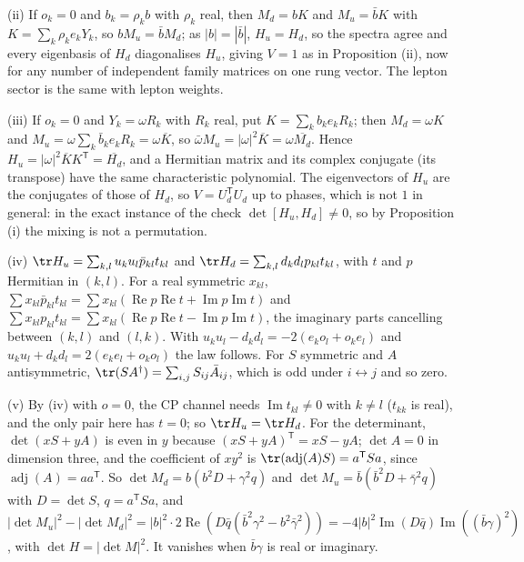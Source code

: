 (ii) If $o_{k} = 0$ and $b_{k} = \rho_{k}b$ with $\rho_{k}$ real, then $M_{d} = bK$ and $M_{u} = \bar{b}K$ with $K = \sum_{k}\rho_{k}e_{k}Y_{k}$, so $bM_{u} = \bar{b}M_{d}$; as $|b| = |\bar{b}|$, $H_{u} = H_{d}$, so the spectra agree and every eigenbasis of $H_{d}$ diagonalises $H_{u}$, giving $V = 1$ as in Proposition (ii), now for any number of independent family matrices on one rung vector. The lepton sector is the same with lepton weights.

(iii) If $o_{k} = 0$ and $Y_{k} = \omega R_{k}$ with $R_{k}$ real, put $K = \sum_{k}b_{k}e_{k}R_{k}$; then $M_{d} = \omega K$ and $M_{u} = \omega\sum_{k}\bar{b}_{k}e_{k}R_{k} = \omega\overline{K}$, so $\bar{\omega}M_{u} = |\omega|^{2}\overline{K} = \omega\overline{M_{d}}$. Hence $H_{u} = |\omega|^{2}\overline{K}K^{\mathsf T} = \overline{H_{d}}$, and a Hermitian matrix and its complex conjugate (its transpose) have the same characteristic polynomial. The eigenvectors of $H_{u}$ are the conjugates of those of $H_{d}$, so $V = U_{d}^{\mathsf T}U_{d}$ up to phases, which is not $1$ in general: in the exact instance of the check $\det[H_{u}, H_{d}] \ne 0$, so by Proposition (i) the mixing is not a permutation.

(iv) $\tr H_{u} = \sum_{k,l}u_{k}u_{l}\bar{p}_{kl}t_{kl}$ and $\tr H_{d} = \sum_{k,l}d_{k}d_{l}p_{kl}t_{kl}$, with $t$ and $p$ Hermitian in $(k, l)$. For a real symmetric $x_{kl}$, $\sum x_{kl}\bar{p}_{kl}t_{kl} = \sum x_{kl}(\operatorname{Re}p\operatorname{Re}t + \operatorname{Im}p\operatorname{Im}t)$ and $\sum x_{kl}p_{kl}t_{kl} = \sum x_{kl}(\operatorname{Re}p\operatorname{Re}t - \operatorname{Im}p\operatorname{Im}t)$, the imaginary parts cancelling between $(k, l)$ and $(l, k)$. With $u_{k}u_{l} - d_{k}d_{l} = -2(e_{k}o_{l} + o_{k}e_{l})$ and $u_{k}u_{l} + d_{k}d_{l} = 2(e_{k}e_{l} + o_{k}o_{l})$ the law follows. For $S$ symmetric and $A$ antisymmetric, $\tr(SA^{\dagger}) = \sum_{i,j}S_{ij}\bar{A}_{ij}$, which is odd under $i \leftrightarrow j$ and so zero.

(v) By (iv) with $o = 0$, the CP channel needs $\operatorname{Im}t_{kl} \ne 0$ with $k \ne l$ ($t_{kk}$ is real), and the only pair here has $t = 0$; so $\tr H_{u} = \tr H_{d}$. For the determinant, $\det(xS + yA)$ is even in $y$ because $(xS + yA)^{\mathsf T} = xS - yA$; $\det A = 0$ in dimension three, and the coefficient of $xy^{2}$ is $\tr(\operatorname{adj}(A)S) = a^{\mathsf T}Sa$, since $\operatorname{adj}(A) = aa^{\mathsf T}$. So $\det M_{d} = b(b^{2}D + \gamma^{2}q)$ and $\det M_{u} = \bar{b}(\bar{b}^{2}D + \bar{\gamma}^{2}q)$ with $D = \det S$, $q = a^{\mathsf T}Sa$, and
$|\det M_{u}|^{2} - |\det M_{d}|^{2} = |b|^{2}\cdot 2\operatorname{Re}(D\bar{q}(\bar{b}^{2}\gamma^{2} - b^{2}\bar{\gamma}^{2})) = -4|b|^{2}\operatorname{Im}(D\bar{q})\operatorname{Im}((\bar{b}\gamma)^{2})$, with $\det H = |\det M|^{2}$. It vanishes when $\bar{b}\gamma$ is real or imaginary.

